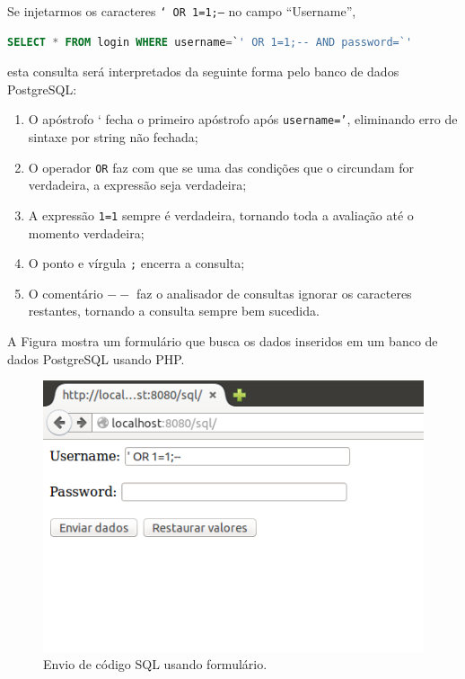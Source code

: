 \begin{frame}[fragile]{}

Se injetarmos os caracteres {\tt ` OR 1=1;--} no campo ``Username'',

\begin{lstlisting}[language=SQL]
SELECT * FROM login WHERE username=`' OR 1=1;-- AND password=`'
\end{lstlisting}

esta consulta será interpretados da seguinte forma pelo banco de dados
PostgreSQL:

\begin{enumerate}
\item O apóstrofo ` fecha o primeiro apóstrofo após {\tt username='},
  eliminando erro de sintaxe por string não fechada;
\item O operador {\tt OR} faz com que se uma das condições que o
  circundam for verdadeira, a expressão seja verdadeira;\pause
\item A expressão {\tt 1=1} sempre é verdadeira, tornando toda a
  avaliação até o momento verdadeira;
\item O ponto e vírgula {\tt ;} encerra a consulta;\pause
\item O comentário {\tt $--$} faz o analisador de consultas ignorar os
  caracteres restantes, tornando a consulta sempre bem sucedida.
\end{enumerate}
\end{frame}

\begin{frame}{}\small
A Figura mostra um formulário que busca os dados inseridos 
em um banco de dados PostgreSQL usando PHP.

  \begin{figure}
    \centering
    \includegraphics[scale=.5]{img/sql-snd.png}
    \caption{Envio de código SQL usando formulário.}
  \end{figure}
\end{frame}

